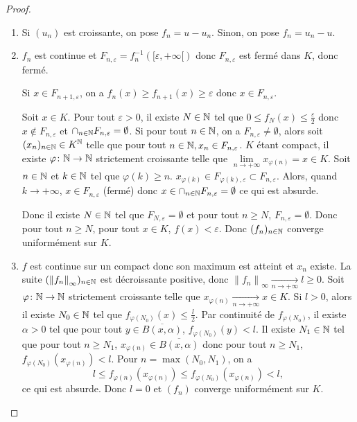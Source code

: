 \documentclass[12pt]{article}
\begin{document}
\begin{proof}
    \phantom{}
    \begin{enumerate}
        \item Si $(u_n)$ est croissante, on pose $f_n=u-u_n$. Sinon, on pose $f_n=u_n-u$.
        \item $f_n$ est continue et $F_{n,\varepsilon}=f_{n}^{-1}\left([\varepsilon,+\infty[\right)$ donc $F_{n,\varepsilon}$ est fermé dans $K$, donc fermé. 
        
        Si $x\in F_{n+1,\varepsilon}$, on a $f_n(x)\geqslant f_{n+1}(x)\geqslant\varepsilon$ donc $x\in F_{n,\varepsilon}$. 
        
        Soit $x\in K$. Pour tout $\varepsilon>0$, il existe $N\in\mathbb{N}$ tel que $0\leqslant f_{N}(x)\leqslant\frac{\varepsilon}{2}$ donc $x\notin F_{n,\varepsilon}$ et $\cap_{n\in\mathbb{N}}F_{n,\varepsilon}=\emptyset$. Si pour tout $n\in\mathbb{N}$, on a $F_{n,\varepsilon}\neq\emptyset$, alors soit $(x_n)_{n\in\mathbb{N}}\in K^{\mathbb{N}}$ telle que pour tout $n\in\mathbb{N},x_n\in F_{n,\varepsilon}$. $K$ étant compact, il existe $\varphi\colon\mathbb{N}\to\mathbb{N}$ strictement croissante telle que $\lim\limits_{n\to+\infty}x_{\varphi(n)}=x\in K$. Soit $n\in\mathbb{N}$ et $k\in\mathbb{N}$ tel que $\varphi(k)\geqslant n$. $x_{\varphi(k)}\in F_{\varphi(k),\varepsilon}\subset F_{n,\varepsilon}$. Alors, quand $k\to+\infty$, $x\in F_{n,\varepsilon}$ (fermé) donc $x\in\cap_{n\in\mathbb{N}}F_{n,\varepsilon}=\emptyset$ ce qui est absurde.

        Donc il existe $N\in\mathbb{N}$ tel que $F_{N,\varepsilon}=\emptyset$ et pour tout $n\geqslant N$, $F_{n,\varepsilon}=\emptyset$. Donc pour tout $n\geqslant N$, pour tout $x\in K$, $f(x)<\varepsilon$. Donc $(f_n)_{n\in\mathbb{N}}$ converge uniformément sur $K$.

        \item $f$ est continue sur un compact donc son maximum est atteint et $x_{n}$ existe. La suite $(\left\lVert f_n\right\rVert_{\infty})_{n\in\mathbb{N}}$ est décroissante positive, donc $\left\lVert f_n\right\rVert_{\infty}\xrightarrow[n\to+\infty]{}l\geqslant0$. Soit $\varphi\colon\mathbb{N}\to\mathbb{N}$ strictement croissante telle que $x_{\varphi(n)}\xrightarrow[n\to+\infty]{}x\in K$. Si $l>0$, alors il existe $N_{0}\in\mathbb{N}$ tel que $f_{\varphi(N_0)}(x)\leqslant\frac{l}{2}$. Par continuité de $f_{\varphi(N_0)}$, il existe $\alpha>0$ tel que pour tout $y\in\overline{B(x,\alpha)}$, $f_{\varphi(N_0)}(y)<l$. Il existe $N_{1}\in\mathbb{N}$ tel que pour tout $n\geqslant N_{1}$, $x_{\varphi(n)}\in\overline{B(x,\alpha)}$ donc pour tout $n\geqslant N_{1}$, $f_{\varphi(N_0)}(x_{\varphi(n)})<l$. Pour $n=\max(N_0,N_1)$, on a 
        \begin{equation*}
            l\leqslant f_{\varphi(n)}(x_{\varphi(n)})\leqslant f_{\varphi(N_{0})}(x_{\varphi(n)})<l,
        \end{equation*}
        ce qui est absurde. Donc $l=0$ et $(f_n)$ converge uniformément sur $K$.
    \end{enumerate}
\end{proof}
\end{document}
